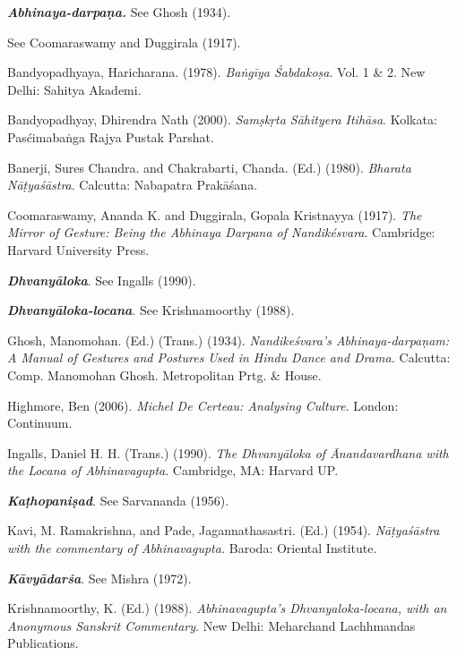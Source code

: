  
\begin{thebibliography}{99}
\itemsep=2pt
{\sl\bfseries Abhinaya-darpaṇa.} See Ghosh (1934).

See Coomaraswamy and Duggirala (1917).

Bandyopadhyaya, Haricharana. (1978). \textsl{Baṅgīya Śabdakoṣa}. Vol. 1 \& 2. New Delhi: Sahitya Akademi. 

Bandyopadhyay, Dhirendra Nath (2000). \textsl{Samṣkṛta Sāhityera Itihāsa}. Kolkata: Pasćimabaṅga Rajya Pustak Parshat. 

Banerji, Sures Chandra. and Chakrabarti, Chanda. (Ed.) (1980). \textsl{Bharata Nāṭyaśāstra}. Calcutta: Nabapatra Prakāśana.

Coomaraswamy, Ananda K. and Duggirala, Gopala Kristnayya (1917). \textsl{The Mirror of Gesture: Being the Abhinaya Darpana of Nandikésvara}. Cambridge: Harvard University Press. 

{\sl\bfseries Dhvanyāloka}. See Ingalls (1990).

{\sl\bfseries Dhvanyāloka-locana}. See Krishnamoorthy (1988).

Ghosh, Manomohan. (Ed.) (Trans.) (1934). \textsl{Nandikeśvara's Abhinaya-darpaṇam: A Manual of Gestures and Postures Used in Hindu Dance and Drama.} Calcutta: Comp. Manomohan Ghosh. Metropolitan Prtg. \& House. 

Highmore, Ben (2006). \textsl{Michel De Certeau: Analysing Culture}. London: Continuum.

Ingalls, Daniel H. H. (Trans.) (1990). \textsl{The Dhvanyāloka of Ānandavardhana with the Locana of Abhinavagupta}. Cambridge, MA: Harvard UP.

{\sl\bfseries Kaṭhopaniṣad}. See Sarvananda (1956).

Kavi, M. Ramakrishna, and Pade, Jagannathasastri. (Ed.) (1954). \textsl{Nāṭyaśāstra with the commentary of Abhinavagupta.} Baroda: Oriental Institute. 

{\sl\bfseries Kāvyādarśa}. See Mishra (1972).

Krishnamoorthy, K. (Ed.) (1988). \textsl{Abhinavagupta's Dhvanyaloka-locana, with an Anonymous Sanskrit Commentary}. New Delhi: Meharchand Lachhmandas Publications. 


\end{thebibliography}
